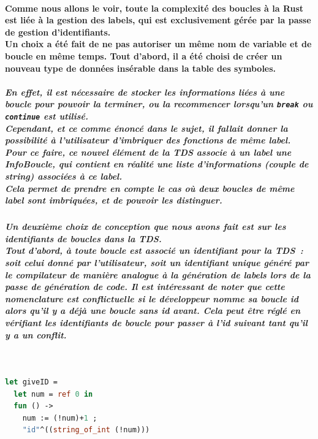 \documentclass[french]{article}
\begin{document}
\paragraph*{Comme nous allons le voir, toute la complexité des boucles à la Rust est liée à la gestion des labels, qui est exclusivement gérée par la passe de gestion d'identifiants.\\
Un choix a été fait de ne pas autoriser un même nom de variable et de boucle en même temps.
Tout d'abord, il a été choisi de créer un nouveau type de données insérable dans la table des symboles.}
\subparagraph*{En effet, il est nécessaire de stocker les informations liées à une boucle pour pouvoir la terminer, ou la recommencer
lorsqu'un \texttt{break} ou \texttt{continue} est utilisé.\\
Cependant, et ce comme énoncé dans le sujet, il fallait donner la possibilité à l'utilisateur d'imbriquer des fonctions de même label.\\
Pour ce faire, ce nouvel élément de la TDS associe à un label une \emph{InfoBoucle}, qui contient en réalité une liste d'informations (couple de \emph{string}) associées à ce label.\\
Cela permet de prendre en compte le cas où deux boucles de même label sont imbriquées, et de pouvoir les distinguer. \\} %
\subparagraph*{Un deuxième choix de conception que nous avons fait est sur les identifiants de boucles dans la TDS.\\
Tout d'abord, à toute boucle est associé un identifiant pour la TDS~: soit celui donné par l'utilisateur, soit un identifiant unique généré par le compilateur
de manière analogue à la génération de labels lors de la passe de génération de code. Il est intéressant de noter que cette nomenclature est conflictuelle si le développeur
nomme sa boucle id alors qu'il y a déjà une boucle sans id avant. Cela peut être réglé en vérifiant les identifiants de boucle pour passer à l'id suivant tant qu'il y a un conflit.}
\,
\begin{lstlisting}[language=Ocaml]
let giveID = 
  let num = ref 0 in
  fun () ->
    num := (!num)+1 ;
    "id"^((string_of_int (!num)))
\end{lstlisting}
\end{document}
